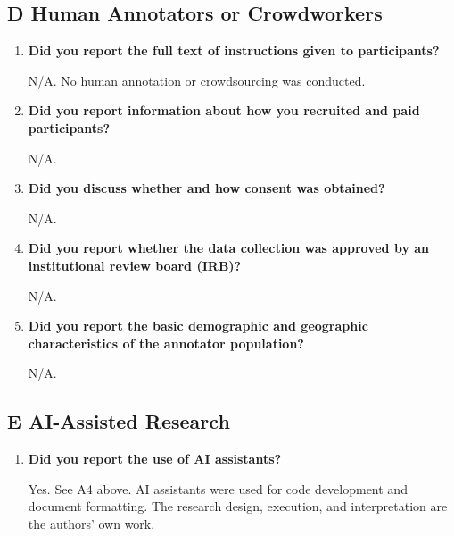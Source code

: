 \subsection*{D \quad Human Annotators or Crowdworkers}

\begin{enumerate}[label=\textbf{D\arabic*.},leftmargin=*,itemsep=4pt]

\item \textbf{Did you report the full text of instructions given to participants?}

N/A. No human annotation or crowdsourcing was conducted.

\item \textbf{Did you report information about how you recruited and paid participants?}

N/A.

\item \textbf{Did you discuss whether and how consent was obtained?}

N/A.

\item \textbf{Did you report whether the data collection was approved by an institutional review board (IRB)?}

N/A.

\item \textbf{Did you report the basic demographic and geographic characteristics of the annotator population?}

N/A.

\end{enumerate}

\subsection*{E \quad AI-Assisted Research}

\begin{enumerate}[label=\textbf{E\arabic*.},leftmargin=*,itemsep=4pt]

\item \textbf{Did you report the use of AI assistants?}

Yes. See A4 above. AI assistants were used for code development and document formatting. The research design, execution, and interpretation are the authors' own work.

\end{enumerate}
